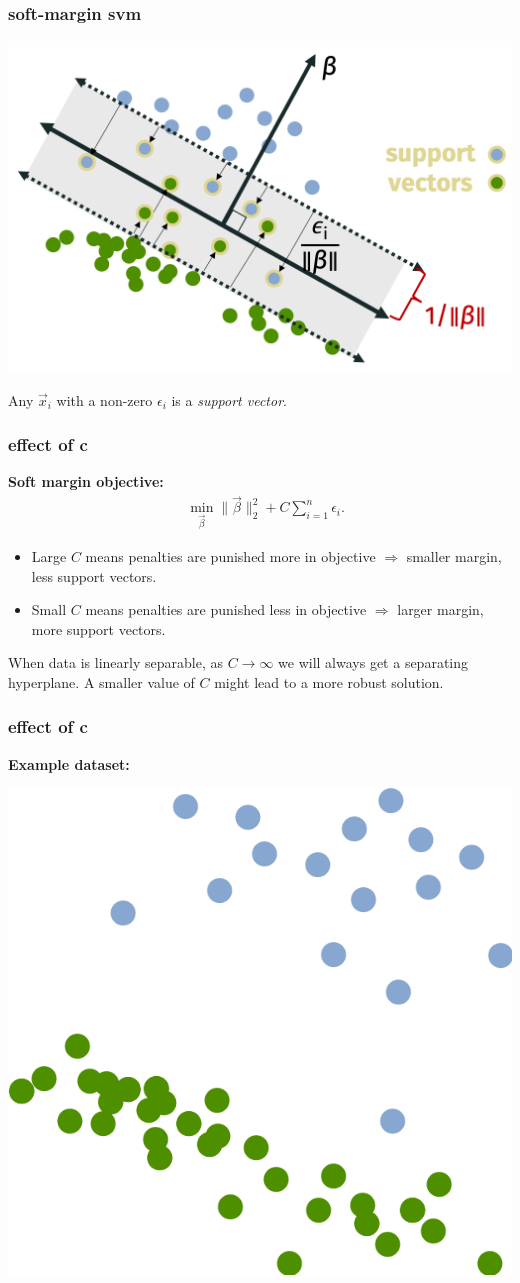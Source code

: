 \documentclass[handout,compress]{beamer}
\begin{document}
\begin{frame}
	\frametitle{soft-margin svm}
	\begin{center}
		\includegraphics[width =.6\textwidth]{soft_support_vectors.png}
	\end{center}
	Any $\vec{x}_i$ with a non-zero $\epsilon_i$ is a \emph{support vector}. 
\end{frame}

\begin{frame}
	\frametitle{effect of c}
	\textbf{Soft margin objective:}
	\begin{align*}
	&\min_{\vec{\beta}} \|\vec{\beta}\|_2^2 + C\sum_{i=1}^n\epsilon_i.
	\end{align*}
	\begin{itemize}
		\item Large $C$ means penalties are punished more in objective $\Longrightarrow$ smaller margin, less support vectors.
		\item Small $C$ means penalties are punished less in objective $\Longrightarrow$ larger margin, more support vectors.
	\end{itemize}
When data is linearly separable, as $C\rightarrow \infty$ we will always get a separating hyperplane. A smaller value of $C$ might lead to a more robust solution. 
\end{frame}

\begin{frame}
	\frametitle{effect of c}
	\textbf{Example dataset:}
	\begin{center}
		\includegraphics[width =.4\textwidth]{c_data.png}
	\end{center}
\end{frame}
\end{document}
